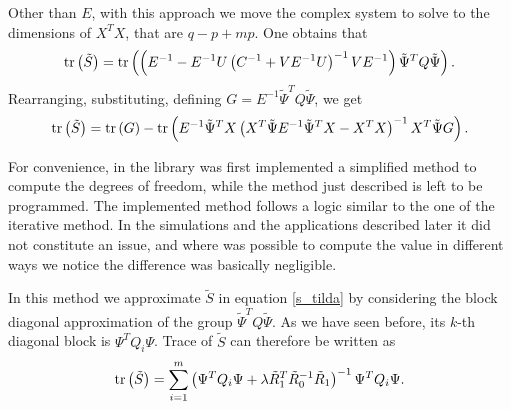 Other than $E$, with this approach we move the complex system to solve to the
dimensions of $X^TX$, that are $q-p+mp$. One obtains that
\begin{equation}
	\operatorname*{tr} \left(\tilde{S} \right) =
	\operatorname*{tr} \left(  \left( E^{-1} - E^{-1}U\left(C^{-1} + V E^{-1}U\right)^{-1}V E^{-1} \right)
	\tilde{\Psi}^TQ \tilde{\Psi} \right).
\end{equation}
Rearranging, substituting, defining $G=E^{-1}\tilde{\Psi}^TQ
	\tilde{\Psi}$, we get
\begin{equation}
	\operatorname*{tr} \left(\tilde{S} \right) =
	\operatorname*{tr} \left(G\right)  -
	\operatorname*{tr} \left(  E^{-1}\tilde{\Psi}^TX\left(X^T \tilde{\Psi} E^{-1}\tilde{\Psi}^TX - X^TX\right)^{-1}X^T \tilde{\Psi} G\right).
\end{equation}

For convenience, in the library was first implemented a simplified method to
compute the degrees of freedom, while the method just described is left to be
programmed. The implemented method follows a logic similar to the one of the
iterative method. In the simulations and the applications described later it
did not constitute an issue, and where was possible to compute the value in
different ways we notice the difference was basically negligible.

In this method we approximate $\tilde{S}$ in equation \ref{s_tilda} by
considering the block diagonal approximation of the group
$\tilde{\Psi}^TQ\tilde{\Psi}$. As we have seen before, its $k$-th diagonal
block is $\Psi^TQ_i\Psi$. Trace of $\tilde{S}$ can therefore be written as
\begin{equation}
	\operatorname*{tr} \left(\tilde{S} \right) = \sum_{i=1}^{m} \left( \Psi^TQ_i\Psi  +  \lambda \tilde{R}_1^T \tilde{R}_0^{-1} \tilde{R}_1\right)^{-1}   \Psi^TQ_i\Psi .
\end{equation}

